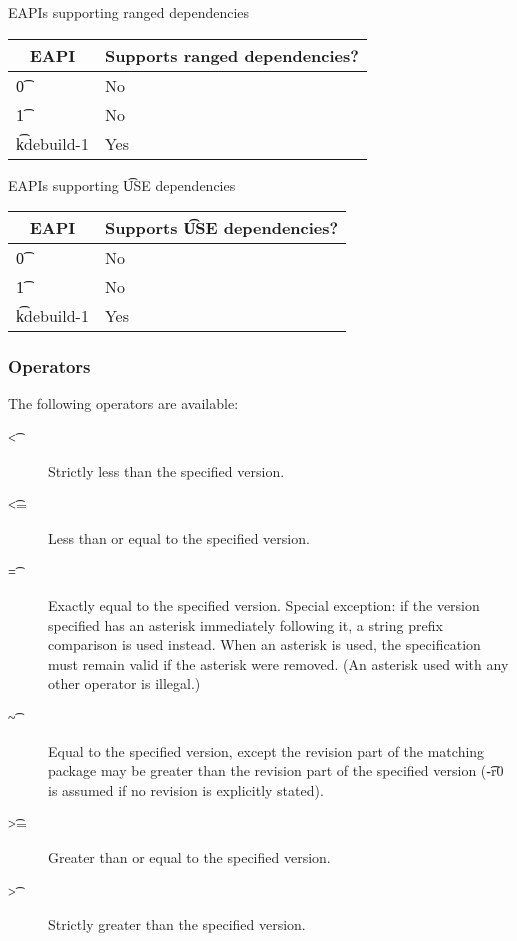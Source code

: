 \IFKDEBUILDELSE
{
    \begin{centertable}{EAPIs supporting ranged dependencies} \label{range-deps-table}
    \begin{tabular}{ l l }
        \toprule
        \multicolumn{1}{c}{\textbf{EAPI}} &
        \multicolumn{1}{c}{\textbf{Supports ranged dependencies?}} \\
        \midrule
    \t{0} & No \\
    \t{1} & No \\
    \t{kdebuild-1} & Yes \\
    \bottomrule
    \end{tabular}
    \end{centertable}

    \begin{centertable}{EAPIs supporting \t{USE} dependencies} \label{use-deps-table}
    \begin{tabular}{ l l }
        \toprule
        \multicolumn{1}{c}{\textbf{EAPI}} &
        \multicolumn{1}{c}{\textbf{Supports \t{USE} dependencies?}} \\
        \midrule
    \t{0} & No \\
    \t{1} & No \\
    \t{kdebuild-1} & Yes \\
    \bottomrule
    \end{tabular}
    \end{centertable}
}{
}

\subsubsection{Operators}
\label{dep-operator}

The following operators are available:

\begin{description}
\item[\t{<}] Strictly less than the specified version.
\item[\t{<=}] Less than or equal to the specified version.
\item[\t{=}] Exactly equal to the specified version. Special exception: if the version
    specified has an asterisk immediately following it, a string prefix comparison is
    used instead. When an asterisk is used, the specification must remain valid if the
    asterisk were removed. (An asterisk used with any other operator is illegal.)
\item[\t{\textasciitilde}] Equal to the specified version, except the revision part of the matching
    package may be greater than the revision part of the specified version (\t{-r0} is
    assumed if no revision is explicitly stated).
\item[\t{>=}] Greater than or equal to the specified version.
\item[\t{>}] Strictly greater than the specified version.
\end{description}

